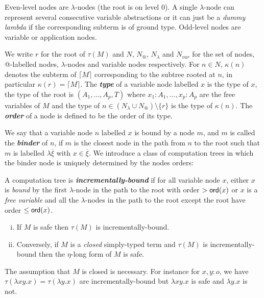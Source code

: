 \documentclass{llncs}
\newcommand\defname[1]{{\bf\em #1}\index{#1}}
\newcommand{\elnf}[1]{\lceil #1\rceil} %
\newcommand\ord[1]{{\sf
    ord}(#1)} \newcommand\typear{\rightarrow}
\newcommand\union{\cup}
\begin{document}
Even-level nodes are $\lambda$-nodes (the root is on level 0). A
single $\lambda$-node can represent several consecutive variable
abstractions or it can just be a \emph{dummy lambda} if the
corresponding subterm is of ground type.  Odd-level nodes are variable
or application nodes.

We write $r$ for the root of $\tau(M)$ and $N$, $N_@$, $N_\lambda$ and
$N_{var}$ for the set of nodes, @-labelled nodes, $\lambda$-nodes and
variable nodes respectively.  For $n \in N$, $\kappa(n)$ denotes the
subterm of $\elnf{M}$ corresponding to the subtree rooted at $n$, in
particular $\kappa(r) = \elnf{M}$.  The \defname{type} of a variable
node labelled $x$ is the type of $x$, the type of the root is
$(A_1,\ldots,A_p, T)$ where $x_1:A_1,\ldots, x_p:A_p$ are the free
variables of $M$ and the type of $n\in (N_\lambda \union N_@)
\setminus \{ r \}$ is the type of $\kappa(n)$. The \defname{order} of
a node is defined to be the order of its type.

We say that a variable node $n$ labelled $x$ is bound by a node $m$,
and $m$ is called the \defname{binder} of $n$, if $m$ is the closest
node in the path from $n$ to the root such that $m$ is labelled
$\lambda \overline{\xi}$ with $x\in \overline{\xi}$.
We introduce a class of computation trees in which the binder
node is uniquely determined by the nodes orders:
\begin{definition}\rm
  A computation tree is \defname{incrementally-bound} if for all
  variable node $x$, either $x$ is \emph{bound} by the first
  $\lambda$-node in the path to the root with order $> \ord{x}$ or $x$
  is a \emph{free variable} and all the $\lambda$-nodes in the path to
  the root except the root have order $\leq \ord{x}$.
\end{definition}

\begin{proposition} %
\label{prop:safe_imp_incrbound}
\begin{enumerate}[(i)]
\item If $M$ is safe then $\tau(M)$ is incrementally-bound.
\item Conversely, if $M$ is a \emph{closed} simply-typed term and $\tau(M)$
is incrementally-bound then the $\eta$-long form of $M$ is safe.
\end{enumerate}
\end{proposition}

The assumption that $M$ is closed is necessary. For instance for
$x,y:o$, we have $\tau(\lambda x y .x) = \tau(\lambda y . x)$ are
incrementally-bound but $\lambda x y .x$ is safe and $\lambda y . x$
is not.
\end{document}

